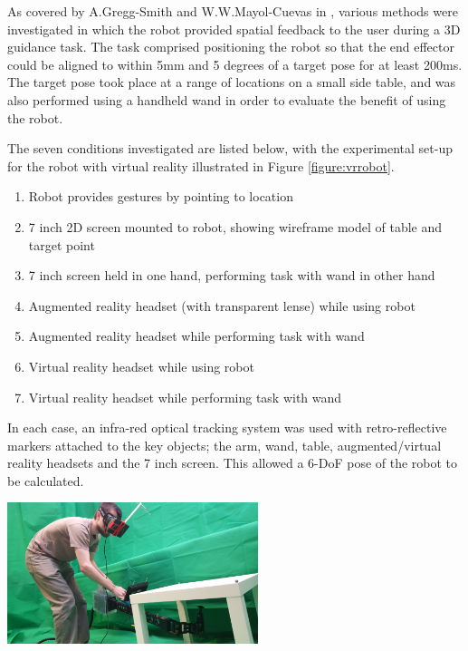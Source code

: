 \documentclass[11pt]{article}
\begin{document}
As covered by A.Gregg-Smith and W.W.Mayol-Cuevas in \cite{GreggSmithFeedback}, various methods were investigated in which the robot provided spatial feedback to the user during a 3D guidance task. The task comprised positioning the robot so that the end effector could be aligned to within 5mm and 5 degrees of a target pose for at least 200ms. The target pose took place at a range of locations on a small side table, and was also performed using a handheld wand in order to evaluate the benefit of using the robot.

The seven conditions investigated are listed below, with the experimental set-up for the robot with virtual reality illustrated in Figure \ref{figure:vrrobot}.
\begin{enumerate}
\item{Robot provides gestures by pointing to location}
\item{7 inch 2D screen mounted to robot, showing wireframe model of table and target point}
\item{7 inch screen held in one hand, performing task with wand in other hand}
\item{Augmented reality headset (with transparent lense) while using robot}
\item{Augmented reality headset while performing task with wand}
\item{Virtual reality headset while using robot}
\item{Virtual reality headset while performing task with wand}
\end{enumerate}

In each case, an infra-red optical tracking system was used with retro-reflective markers attached to the key objects; the arm, wand, table, augmented/virtual reality headsets and the 7 inch screen. This allowed a 6-DoF pose of the robot to be calculated.

\begin{center}
\includegraphics[width=0.55\textwidth]{vrrobot.png}
\label{figure:vrrobot}
\end{center} 
 
\end{document}
